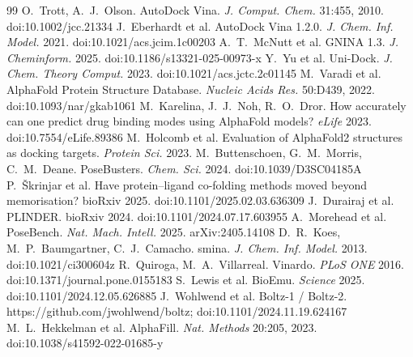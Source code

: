 \documentclass[10pt,a4paper,twocolumn]{article}
\begin{document}
\footnotesize\raggedright
\begin{thebibliography}{99}\setlength{\itemsep}{0pt}
 O.~Trott, A.~J.~Olson. AutoDock Vina. \emph{J. Comput. Chem.} 31:455, 2010. doi:10.1002/jcc.21334
 J.~Eberhardt et al. AutoDock Vina 1.2.0. \emph{J. Chem. Inf. Model.} 2021. doi:10.1021/acs.jcim.1c00203
 A.~T.~McNutt et al. GNINA 1.3. \emph{J. Cheminform.} 2025. doi:10.1186/s13321-025-00973-x
 Y.~Yu et al. Uni-Dock. \emph{J. Chem. Theory Comput.} 2023. doi:10.1021/acs.jctc.2c01145
 M.~Varadi et al. AlphaFold Protein Structure Database. \emph{Nucleic Acids Res.} 50:D439, 2022. doi:10.1093/nar/gkab1061
 M.~Karelina, J.~J.~Noh, R.~O.~Dror. How accurately can one predict drug binding modes using AlphaFold models? \emph{eLife} 2023. doi:10.7554/eLife.89386
 M.~Holcomb et al. Evaluation of AlphaFold2 structures as docking targets. \emph{Protein Sci.} 2023.
 M.~Buttenschoen, G.~M.~Morris, C.~M.~Deane. PoseBusters. \emph{Chem. Sci.} 2024. doi:10.1039/D3SC04185A
 P.~\v{S}krinjar et al. Have protein--ligand co-folding methods moved beyond memorisation? bioRxiv 2025. doi:10.1101/2025.02.03.636309
 J.~Durairaj et al. PLINDER. bioRxiv 2024. doi:10.1101/2024.07.17.603955
 A.~Morehead et al. PoseBench. \emph{Nat. Mach. Intell.} 2025. arXiv:2405.14108
 D.~R.~Koes, M.~P.~Baumgartner, C.~J.~Camacho. smina. \emph{J. Chem. Inf. Model.} 2013. doi:10.1021/ci300604z
 R.~Quiroga, M.~A.~Villarreal. Vinardo. \emph{PLoS ONE} 2016. doi:10.1371/journal.pone.0155183
 S.~Lewis et al. BioEmu. \emph{Science} 2025. doi:10.1101/2024.12.05.626885
 J.~Wohlwend et al. Boltz-1 / Boltz-2. https://github.com/jwohlwend/boltz; doi:10.1101/2024.11.19.624167
 M.~L.~Hekkelman et al. AlphaFill. \emph{Nat. Methods} 20:205, 2023. doi:10.1038/s41592-022-01685-y
\end{thebibliography}
\end{document}

